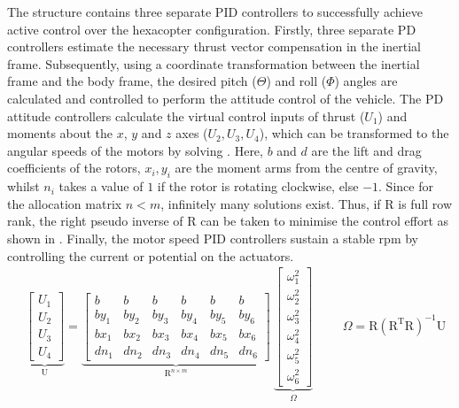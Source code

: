 The structure contains three separate PID controllers to successfully achieve active control over the hexacopter configuration.
Firstly, three separate PD controllers estimate the necessary thrust vector compensation in the inertial frame.
Subsequently, using a coordinate transformation between the inertial frame and the body frame, the desired pitch ($\Theta$) and roll ($\Phi$) angles are calculated and controlled to perform the attitude control of the vehicle.
The PD attitude controllers calculate the virtual control inputs of thrust ($U_1$) and moments about the $x$, $y$ and $z$ axes ($U_2, U_3, U_4$), which can be transformed to the angular speeds of the motors by solving .
Here, $b$ and $d$ are the lift and drag coefficients of the rotors, $x_i, y_i$ are the moment arms from the centre of gravity, whilst $n_i$ takes a value of $1$ if the rotor is rotating clockwise, else $-1$.
Since for the allocation matrix $n < m$, infinitely many solutions exist.
Thus, if R is full row rank, the right pseudo inverse of R can be taken to minimise the control effort as shown in  \cite{quadcopter_control_allocation}.
Finally, the motor speed PID controllers sustain a stable rpm by controlling the current or potential on the actuators.
\begin{align}
\label{eq:alloc_mx}
    &\underbrace{\begin{bmatrix}
        U_1\\U_2\\ U_3\\U_4
    \end{bmatrix}}_{\text{U}} = 
    \underbrace{\begin{bmatrix}
        b & b & b & b & b & b \\
        by_1 & by_2 & by_3 & by_4 & by_5 & by_6 \\
        bx_1 & bx_2 & bx_3 & bx_4 & bx_5 & bx_6 \\
        dn_1 & dn_2 & dn_3 & dn_4 & dn_5& dn_6
    \end{bmatrix}}_{\text{R}^{n\times m}} \ 
    \underbrace{\begin{bmatrix}
        \omega^2_1\\
        \omega^2_2\\
        \omega^2_3\\
        \omega^2_4\\
        \omega^2_5\\
        \omega^2_6
    \end{bmatrix}}_{\Omega} & & & \Omega = \text{R}(\text{R}^\text{T}\text{R})^{-1}\text{U}
\end{align}

